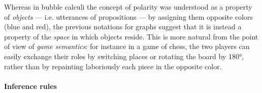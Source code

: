 \begin{remark}
  Whereas in bubble calculi the concept of polarity was understood as a property
  of \emph{objects} --- i.e. utterances of propositions --- by assigning them
  opposite colors (blue and red), the previous notations for graphs suggest that
  it is instead a property of the \emph{space} in which objects reside. This is
  more natural from the point of view of \emph{game semantics}: for instance in
  a game of chess, the two players can easily exchange their roles by switching
  places or rotating the board by 180°, rather than by repainting laboriously
  each piece in the opposite color.
\end{remark}

\paragraph{Inference rules}

